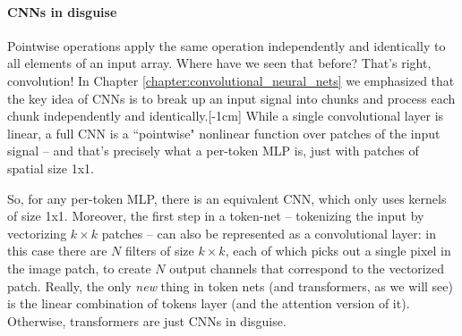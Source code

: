 

\paragraph*{CNNs in disguise} Pointwise operations apply the same operation independently and identically to all elements of an input array. Where have we seen that before? That's right, convolution! In Chapter \ref{chapter:convolutional_neural_nets} we emphasized that the key idea of CNNs is to break up an input signal into chunks and process each chunk independently and identically.[-1cm] While a single convolutional layer is linear, a full CNN is a ``pointwise" nonlinear function over patches of the input signal -- and that's precisely what a per-token MLP is, just with patches of spatial size 1x1.

So, for any per-token MLP, there is an equivalent CNN, which only uses kernels of size 1x1. Moreover, the first step in a token-net -- tokenizing the input by vectorizing $k \times k$ patches -- can also be represented as a convolutional layer: in this case there are $N$ filters of size $k \times k$, each of which picks out a single pixel in the image patch, to create $N$ output channels that correspond to the vectorized patch. Really, the only \textit{new} thing in token nets (and transformers, as we will see) is the linear combination of tokens layer (and the attention version of it). Otherwise, transformers are just CNNs in disguise.

